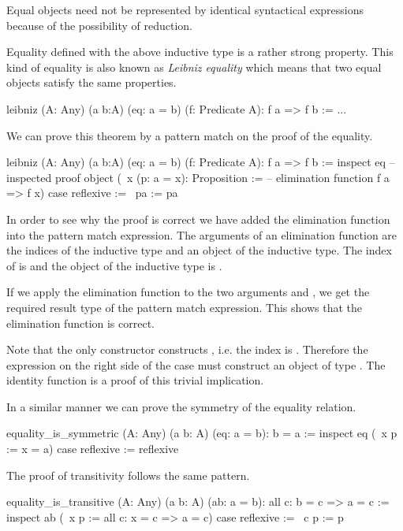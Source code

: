 Equal objects need not be represented by identical syntactical expressions
because of the possibility of reduction.

Equality defined with the above inductive type is a rather strong
property. This kind of equality is also known as \emph{Leibniz equality} which
means that two equal objects satisfy the same properties.
%
\begin{alba}
  leibniz (A: Any) (a b:A) (eq: a = b) (f: Predicate A): f a => f b :=
    ...
\end{alba}


We can prove this theorem by a pattern match on the proof of the equality.
%
\begin{alba}
  leibniz (A: Any) (a b:A) (eq: a = b) (f: Predicate A): f a => f b :=
    inspect
      eq                                  -- inspected proof object
      (\ x (p: a = x): Proposition :=     -- elimination function
         f a => f x)
    case
      reflexive :=
        \ pa  := pa
\end{alba}
%
In order to see why the proof is correct we have added the elimination
function into the pattern match expression. The arguments of an elimination
function are the indices of the inductive type and an object of the inductive
type. The index of  is  and the object of the inductive
type is .

If we apply the elimination function to the two arguments
 and , we get the required result type  of
the pattern match expression. This shows that the elimination function is
correct.

Note that the only constructor  constructs ,
i.e. the index is . Therefore the expression on the right side of the
case must construct an object of type . The identity function
is a proof of this trivial implication.

In a similar manner we can prove the symmetry of the equality relation.

\begin{alba}
   equality_is_symmetric
     (A: Any) (a b: A) (eq: a = b): b = a :=
       inspect
         eq
         (\ x p := x = a)
       case
         reflexive := reflexive
\end{alba}

The proof of transitivity follows the same pattern.

\begin{alba}
   equality_is_transitive
     (A: Any) (a b: A) (ab: a = b): all c: b = c => a = c :=
       inspect
         ab
         (\ x p := all c: x = c => a = c)
       case
         reflexive :=
           \ c p := p
\end{alba}


